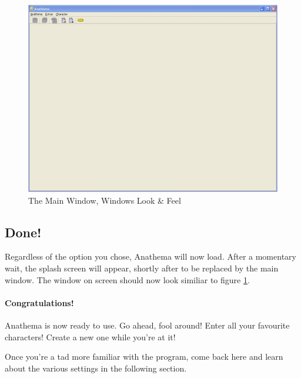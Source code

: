 \begin{figure}[htb]
	\centering
		\includegraphics[width=1.00\textwidth]{images/MainWindow.jpg}
	\caption{The Main Window, Windows Look \& Feel}
	\label{fig:MainWindow}
\end{figure}

\subsection{Done!}
Regardless of the option you chose, Anathema will now load. After a momentary wait, the splash screen will appear, shortly after to be replaced by the main window. The window on screen should now look similiar to figure \ref{fig:MainWindow}.

\paragraph{Congratulations!} Anathema is now ready to use. Go ahead, fool around! Enter all your favourite characters! Create a new one while you're at it!
\medskip

Once you're a tad more familiar with the program, come back here and learn about the various settings in the following section.

